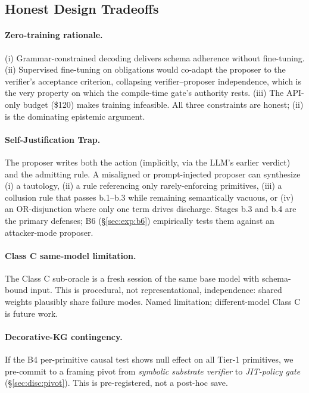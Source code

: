 \documentclass{article}
\theoremstyle{definition}
\begin{document}
\subsection{Honest Design Tradeoffs}
\label{sec:method:tradeoffs}

\paragraph{Zero-training rationale.}
(i) Grammar-constrained decoding delivers schema adherence without
fine-tuning. (ii) Supervised fine-tuning on obligations would
co-adapt the proposer to the verifier's acceptance criterion,
collapsing verifier--proposer independence, which is the very
property on which the compile-time gate's authority rests.
(iii) The API-only budget (\$120) makes training infeasible. All
three constraints are honest; (ii) is the dominating epistemic
argument.

\paragraph{Self-Justification Trap.}
The proposer writes both the action (implicitly, via the LLM's
earlier verdict) and the admitting rule. A misaligned or
prompt-injected proposer can synthesize (i) a tautology, (ii) a rule
referencing only rarely-enforcing primitives, (iii) a collusion rule
that passes b.1--b.3 while remaining semantically vacuous, or
(iv) an OR-disjunction where only one term drives discharge. Stages
b.3 and b.4 are the primary defenses; B6
(\S\ref{sec:exp:b6}) empirically tests them against an attacker-mode
proposer.

\paragraph{Class C same-model limitation.}
The Class C sub-oracle is a fresh session of the same base model with
schema-bound input. This is procedural, not representational,
independence: shared weights plausibly share failure modes. Named
limitation; different-model Class C is future work.

\paragraph{Decorative-KG contingency.}
If the B4 per-primitive causal test shows null effect on all Tier-1
primitives, we pre-commit to a framing pivot from \emph{symbolic
substrate verifier} to \emph{JIT-policy gate}
(\S\ref{sec:disc:pivot}). This is pre-registered, not a post-hoc
save.
\end{document}
